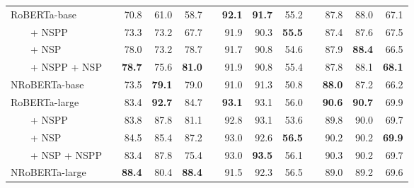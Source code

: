 \begin{tabular}{l r@{\hspace{0.15in}} rrr r@{\hspace{0.10in}} rrr r@{\hspace{0.10in}} rrr}
\midrule
\midrule
{RoBERTa-base}   &&  70.8  &  61.0  &  58.7  &&  \textbf{92.1}  &  \textbf{91.7}  &  55.2  &&  87.8  &  88.0  &  67.1  \\ 
~~~~+ NSPP &&  73.3 & 73.2 & 67.7  &&  91.9  &  90.3  &  \textbf{55.5}  &&  87.4  &  87.6  &  67.5  \\ 
~~~~+ NSP &&  78.0 & 73.2 & 78.7  &&  91.7  &  90.8  &  54.6  &&  87.9  &  \textbf{88.4}  &  66.5  \\ 
~~~~+ NSPP + NSP &&  \textbf{78.7} & 75.6 & \textbf{81.0}  &&  91.9  &  90.8  &  55.4  &&  87.8  &  88.1  &  \textbf{68.1}  \\ 
{NRoBERTa-base} \cite{singh-etal-2023-nlms} && 73.5 & \textbf{79.1} & 79.0 && 91.0 & 91.3 & 50.8 && \textbf{88.0} & 87.2 & 66.2\\
\midrule
{RoBERTa-large}  &&  83.4  &  \textbf{92.7}  &  84.7  &&  \textbf{93.1}  &  93.1  &  56.0  &&  \textbf{90.6}  &  \textbf{90.7} &  69.9  \\ 
~~~~+ NSPP &&  83.8  &  87.8  &  81.1  &&  92.8  &  93.1  &  53.6  &&  89.8  &  90.0  &  69.7  \\ 
~~~~+ NSP &&  84.5  &  85.4  &  87.2  &&  93.0  &  92.6  &  \textbf{56.5}  &&  90.2  &  90.2  &  \textbf{69.9}  \\ 
~~~~+ NSP + NSPP &&  83.4  &  87.8  &  75.4  &&  93.0  &  \textbf{93.5}  &  56.1  &&  90.3  &  90.2  &  69.7  \\ 
{NRoBERTa-large}  \cite{singh-etal-2023-nlms} && \textbf{88.4} & 80.4 & \textbf{88.4} && 91.5 & 92.3 & 56.5 && 89.0 & 89.2 & 69.6 \\
\bottomrule
\end{tabular}